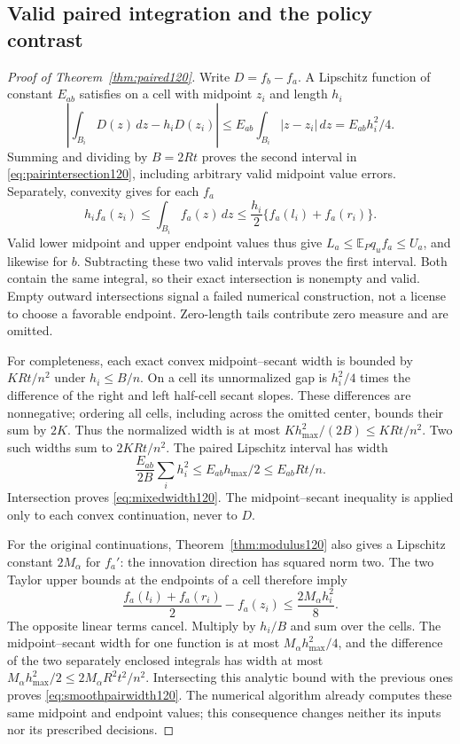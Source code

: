 \subsection{Valid paired integration and the policy contrast}
\begin{proof}[Proof of Theorem~\ref{thm:paired120}]
Write $D=f_b-f_a$.  A Lipschitz function of constant $E_{ab}$
satisfies on a cell with midpoint $z_i$ and length $h_i$
\[
 \left|\int_{B_i}D(z)\,dz-h_iD(z_i)\right|
 \le E_{ab}\int_{B_i}|z-z_i|\,dz
 =E_{ab}h_i^2/4.
\]
Summing and dividing by $B=2Rt$ proves the second interval in
\eqref{eq:pairintersection120}, including arbitrary valid midpoint
value errors.  Separately, convexity gives for each $f_a$
\[
 h_if_a(z_i)\le\int_{B_i}f_a(z)\,dz
       \le\frac{h_i}{2}\{f_a(l_i)+f_a(r_i)\}.
\]
Valid lower midpoint and upper endpoint values thus give
$L_a\le\mathbb E_Pq_uf_a\le U_a$, and likewise for $b$.
Subtracting these two valid intervals proves the first interval.
Both contain the same integral, so their exact intersection is
nonempty and valid.  Empty outward intersections signal a failed
numerical construction, not a license to choose a favorable endpoint.
Zero-length tails contribute zero measure and are omitted.

For completeness, each exact convex midpoint--secant width is
bounded by $KRt/n^2$ under $h_i\le B/n$.  On a cell its unnormalized
gap is $h_i^2/4$ times the difference of the right and left
half-cell secant slopes.  These differences are nonnegative; ordering
all cells, including across the omitted center, bounds their sum by
$2K$.  Thus the normalized width is at most
$Kh_{\max}^2/(2B)\le KRt/n^2$.
Two such widths sum to $2KRt/n^2$.
The paired Lipschitz interval has width
\[
 \frac{E_{ab}}{2B}\sum_i h_i^2
 \le E_{ab}h_{\max}/2\le E_{ab}Rt/n.
\]
Intersection proves \eqref{eq:mixedwidth120}.
The midpoint--secant inequality is applied only to each convex
continuation, never to $D$.

For the original continuations, Theorem~\ref{thm:modulus120}
also gives a Lipschitz constant $2M_\alpha$ for $f_a'$:
the innovation direction has squared norm two.
The two Taylor upper bounds at the endpoints of a cell
therefore imply
\[
 \frac{f_a(l_i)+f_a(r_i)}2-f_a(z_i)
 \le \frac{2M_\alpha h_i^2}{8}.
\]
The opposite linear terms cancel.  Multiply by $h_i/B$
and sum over the cells.  The midpoint--secant width for
one function is at most $M_\alpha h_{\max}^2/4$,
and the difference of the two separately enclosed
integrals has width at most
$M_\alpha h_{\max}^2/2\le2M_\alpha R^2t^2/n^2$.
Intersecting this analytic bound with the previous
ones proves \eqref{eq:smoothpairwidth120}.
The numerical algorithm already computes these same
midpoint and endpoint values; this consequence changes
neither its inputs nor its prescribed decisions.


\end{proof}
